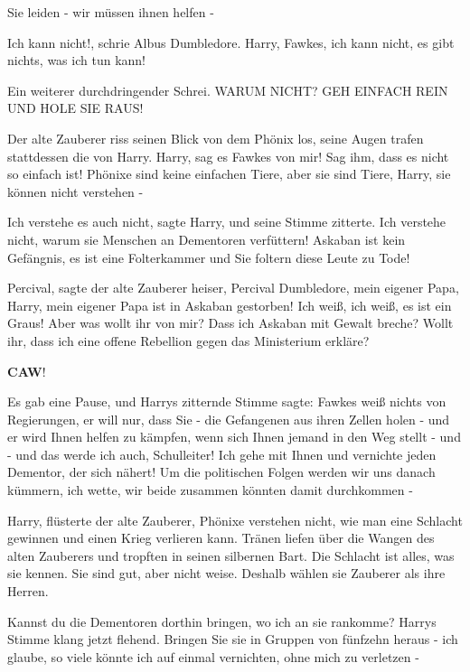 \glqq{}Sie leiden - wir müssen ihnen helfen -\grqq{}

\glqq{}Ich kann nicht!\grqq{}, schrie Albus Dumbledore. \glqq{}Harry, Fawkes, ich
kann nicht, es gibt nichts, was ich tun kann!\grqq{}

Ein weiterer durchdringender Schrei. \glqq{}WARUM NICHT? GEH EINFACH REIN UND
HOLE SIE RAUS!\grqq{}

Der alte Zauberer riss seinen Blick von dem Phönix los, seine Augen trafen
stattdessen die von Harry. \glqq{}Harry, sag es Fawkes von mir! Sag ihm, dass es
nicht so einfach ist! Phönixe sind keine einfachen Tiere, aber sie sind Tiere,
Harry, sie können nicht verstehen -\grqq{}

\glqq{}Ich verstehe es auch nicht\grqq{}, sagte Harry, und seine Stimme zitterte.
\glqq{}Ich verstehe nicht, warum sie Menschen an Dementoren verfüttern! Askaban
ist kein Gefängnis, es ist eine Folterkammer und Sie foltern diese Leute zu
Tode!\grqq{}

\glqq{}Percival\grqq{}, sagte der alte Zauberer heiser, \glqq{}Percival
Dumbledore, mein eigener Papa, Harry, mein eigener Papa ist in Askaban
gestorben! Ich weiß, ich weiß, es ist ein Graus! Aber was wollt ihr von mir?
Dass ich Askaban mit Gewalt breche? Wollt ihr, dass ich eine offene Rebellion
gegen das Ministerium erkläre?\grqq{}

\textbf{CAW}!

Es gab eine Pause, und Harrys zitternde Stimme sagte: \glqq{}Fawkes weiß nichts
von Regierungen, er will nur, dass Sie - die Gefangenen aus ihren Zellen holen -
und er wird Ihnen helfen zu kämpfen, wenn sich Ihnen jemand in den Weg stellt -
und - und das werde ich auch, Schulleiter! Ich gehe mit Ihnen und vernichte
jeden Dementor, der sich nähert! Um die politischen Folgen werden wir uns danach
kümmern, ich wette, wir beide zusammen könnten damit durchkommen -\grqq{}

\glqq{}Harry\grqq{}, flüsterte der alte Zauberer, \glqq{}Phönixe verstehen nicht,
wie man eine Schlacht gewinnen und einen Krieg verlieren kann.\grqq{} Tränen
liefen über die Wangen des alten Zauberers und tropften in seinen silbernen
Bart. \glqq{}Die Schlacht ist alles, was sie kennen. Sie sind gut, aber nicht
weise. Deshalb wählen sie Zauberer als ihre Herren.\grqq{}

\glqq{}Kannst du die Dementoren dorthin bringen, wo ich an sie rankomme?\grqq{}
Harrys Stimme klang jetzt flehend. \glqq{}Bringen Sie sie in Gruppen von fünfzehn
heraus - ich glaube, so viele könnte ich auf einmal vernichten, ohne mich zu
verletzen -\grqq{}

